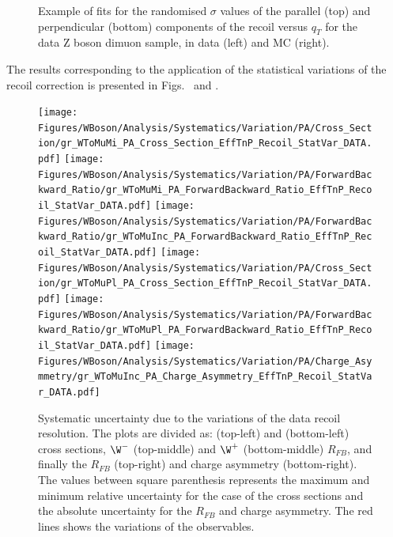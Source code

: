 \begin{figure} [!htbp]
\begin{center}
\caption{Example of fits for the randomised $\sigma$ values of the parallel (top) and perpendicular (bottom) components of the recoil versus $q_{T}$ for the data Z boson dimuon sample, in data (left) and MC (right).}
\label{fig:figU12RecoilResolutionFit_gauss}
\end{center}
\end{figure}

The results corresponding to the application of the statistical variations of the recoil correction is presented in Figs.~ and .

\begin{figure}[!htbp]
 \begin{center}
  \texttt{[image: Figures/WBoson/Analysis/Systematics/Variation/PA/Cross\_Section/gr\_WToMuMi\_PA\_Cross\_Section\_EffTnP\_Recoil\_StatVar\_DATA.pdf]}
  \texttt{[image: Figures/WBoson/Analysis/Systematics/Variation/PA/ForwardBackward\_Ratio/gr\_WToMuMi\_PA\_ForwardBackward\_Ratio\_EffTnP\_Recoil\_StatVar\_DATA.pdf]}
  \texttt{[image: Figures/WBoson/Analysis/Systematics/Variation/PA/ForwardBackward\_Ratio/gr\_WToMuInc\_PA\_ForwardBackward\_Ratio\_EffTnP\_Recoil\_StatVar\_DATA.pdf]}
  \texttt{[image: Figures/WBoson/Analysis/Systematics/Variation/PA/Cross\_Section/gr\_WToMuPl\_PA\_Cross\_Section\_EffTnP\_Recoil\_StatVar\_DATA.pdf]}
  \texttt{[image: Figures/WBoson/Analysis/Systematics/Variation/PA/ForwardBackward\_Ratio/gr\_WToMuPl\_PA\_ForwardBackward\_Ratio\_EffTnP\_Recoil\_StatVar\_DATA.pdf]}
  \texttt{[image: Figures/WBoson/Analysis/Systematics/Variation/PA/Charge\_Asymmetry/gr\_WToMuInc\_PA\_Charge\_Asymmetry\_EffTnP\_Recoil\_StatVar\_DATA.pdf]}
 \end{center}
 \caption{Systematic uncertainty due to the variations of the data recoil resolution. The plots are divided as: \WToMuNuMi (top-left) and \WToMuNuPl (bottom-left) cross sections, $\W^{-}$ (top-middle) and $\W^{+}$ (bottom-middle) $R_{FB}$, and finally the \W $R_{FB}$ (top-right) and \W charge asymmetry (bottom-right). The values between square parenthesis represents the maximum and minimum relative uncertainty for the case of the cross sections and the absolute uncertainty for the $R_{FB}$ and charge asymmetry. The red lines shows the variations of the observables.}
 \label{fig:Recoil_StatVar_DATA}
\end{figure}

